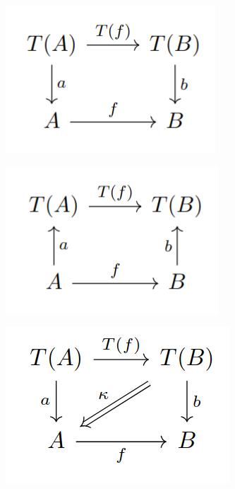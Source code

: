\documentclass[11pt,a4paper,openright,twoside]{report}
\theoremstyle{plain}
\theoremstyle{definition}
\begin{document}
\begin{figure}[h]
  \begin{center}
    \begin{subfigure}{0.25\textwidth}
      \includegraphics[width=\textwidth]{figures/algebra_hom.png}
      \caption{}
    \end{subfigure}
    \begin{subfigure}{0.25\textwidth}
      \includegraphics[width=\textwidth]{figures/coalgebra_hom.png}
      \caption{}
    \end{subfigure}   
    \begin{subfigure}{0.25\textwidth}
      \includegraphics[width=\textwidth]{figures/lax_algebra_hom.png}

\end{subfigure}
\end{center}
\end{figure}
\end{document}
